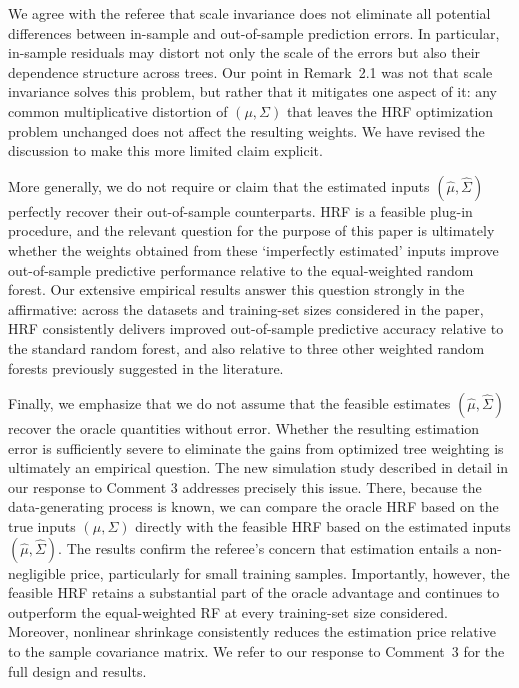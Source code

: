 \documentclass[12pt]{article}
\begin{document}
We agree with the referee that scale invariance does not eliminate all potential differences between in-sample and out-of-sample prediction errors. In particular, in-sample residuals may distort not only the scale of the errors but also their dependence structure across trees. Our point in Remark~2.1 was not that scale invariance solves this problem, but rather that it mitigates one aspect of it: any common multiplicative distortion of $(\mu,\Sigma)$ that leaves the HRF optimization problem unchanged does not affect the resulting weights. We have revised the discussion to make this more limited claim explicit.

More generally, we do not require or claim that the estimated inputs $(\hat \mu,\hat\Sigma)$ perfectly recover their out-of-sample counterparts. HRF is a feasible plug-in procedure, and the relevant question for the purpose of this paper is ultimately whether the weights obtained from these `imperfectly estimated' inputs improve out-of-sample predictive performance relative to the equal-weighted random forest. Our extensive empirical results answer this question strongly in the affirmative: across the datasets and training-set sizes considered in the paper, HRF consistently delivers improved out-of-sample predictive accuracy relative to the standard random forest,
and also relative to three other weighted random forests previously suggested in the literature. 

Finally, we emphasize that we do not assume that the feasible estimates
$(\hat{\mu},\hat{\Sigma})$ recover the oracle quantities without
error. Whether the resulting estimation error is sufficiently severe to
eliminate the gains from optimized tree weighting is ultimately an empirical
question. The new simulation study described in detail in our response to
Comment 3 addresses precisely this issue. There, because the data-generating
process is known, we can compare the oracle HRF based on 
the true inputs $(\mu,\Sigma)$
directly with the feasible HRF based on the estimated inputs
$(\hat{\mu},\hat{\Sigma})$. The results confirm the referee's concern
that estimation entails a non-negligible price, particularly for small
training samples. Importantly, however, the feasible HRF retains a substantial
part of the oracle advantage and continues to outperform the equal-weighted RF
at every training-set size considered. Moreover, nonlinear shrinkage
consistently reduces the estimation price relative to the sample covariance
matrix. We refer to our response to Comment~3 for the full design and results.
\end{document}
